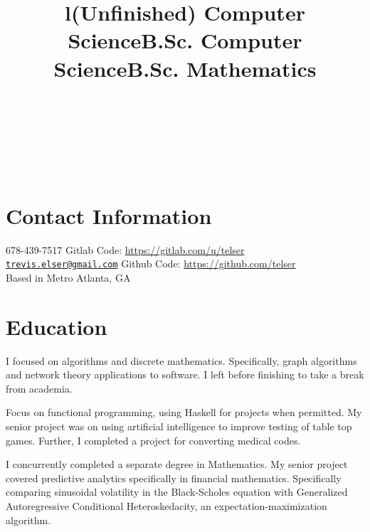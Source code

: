 \documentclass[margintitle,line]{res}
\begin{document}

\begin{resume}

\begin{format}
\\
\title{l}\\
\body\\
\end{format}

\section{Contact Information}

678-439-7517  \hfill {Gitlab Code:}
\href{https://gitlab.com/u/telser}{https://gitlab.com/u/telser}  \\
\href{mailto:trevis.elser@gmail.com}{\nolinkurl{trevis.elser@gmail.com}} \hfill {Github Code:} \href{https://github.com/telser}{https://github.com/telser} \\
Based in Metro Atlanta, GA

\section{Education}

\title{(Unfinished) Computer Science}
\begin{position}
I focused on algorithms and discrete mathematics. Specifically, graph
algorithms and network theory applications to software. I left before
finishing to take a break from academia.
\end{position}

\title{B.Sc. Computer Science}
\begin{position}
Focus on functional programming, using Haskell for projects when
permitted. My senior project was on using artificial intelligence to
improve testing of table top games. Further, I completed a project for
converting medical codes.
\end{position}

\title{B.Sc. Mathematics}
\begin{position}
I concurrently completed a separate degree in Mathematics. My senior
project covered predictive analytics specifically in financial
mathematics. Specifically comparing sinusoidal volatility in the
Black-Scholes equation with Generalized Autoregressive Conditional
Heteroskedacity, an expectation-maximization algorithm.
\end{position}


\end{resume}
\end{document}
